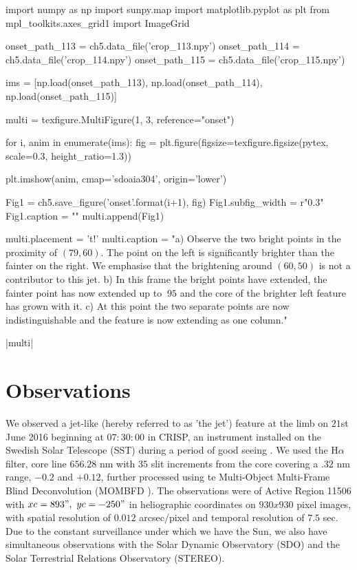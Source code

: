 \begin{pycode}[chapter5]
import numpy as np
import sunpy.map
import matplotlib.pyplot as plt
from mpl_toolkits.axes_grid1 import ImageGrid

onset_path_113 = ch5.data_file('crop_113.npy')
onset_path_114 = ch5.data_file('crop_114.npy')
onset_path_115 = ch5.data_file('crop_115.npy')

ims = [np.load(onset_path_113), np.load(onset_path_114), np.load(onset_path_115)]


multi = texfigure.MultiFigure(1, 3, reference="onset")

for i, anim in enumerate(ims):
    fig = plt.figure(figsize=texfigure.figsize(pytex, scale=0.3, height_ratio=1.3))

    plt.imshow(anim, cmap='sdoaia304', origin='lower')

    Fig1 = ch5.save_figure('onset{}'.format(i+1), fig)
    Fig1.subfig_width = r"0.3\textwidth"
    Fig1.caption = ""
    multi.append(Fig1)

multi.placement = 't!'
multi.caption = "a) Observe the two bright points in the proximity of $(79, 60)$. The point on the left is significantly brighter than the fainter on the right. We emphasise that the brightening around $(60, 50)$ is not a contributor to this jet. b) In this frame the bright points have extended, the fainter point has now extended up to $~95$ and the core of the brighter left feature has grown with it. c) At this point the two separate points are now indistinguishable and the feature is now extending as one column."
\end{pycode}

\py[chapter5]|multi|



\section{Observations}
\label{obs_sect}
We observed a jet-like (hereby referred to as 'the jet') feature at the limb on $21$st June 2016 beginning at $07:30:00$ in CRISP, an instrument installed on the Swedish Solar Telescope (SST) during a period of good seeing \citep{Scharmer2003}.
We used the H$\alpha$ filter, core line $656.28$ nm with $35$ slit increments from the core covering a $.32$ nm range, $-0.2$ and $+0.12$, further processed using te Multi-Object Multi-Frame Blind Deconvolution (MOMBFD \cite{vanNoort2005}).
The observations were of Active Region 11506 with $xc = 893",\ yc = -250"$ in heliographic coordinates on $930x930$ pixel images, with spatial resolution of $0.012$ arcsec/pixel and temporal resolution of $7.5$ sec.
Due to the constant surveillance under which we have the Sun, we also have simultaneous observations with the Solar Dynamic Observatory (SDO) and the Solar Terrestrial Relations Observatory (STEREO).

